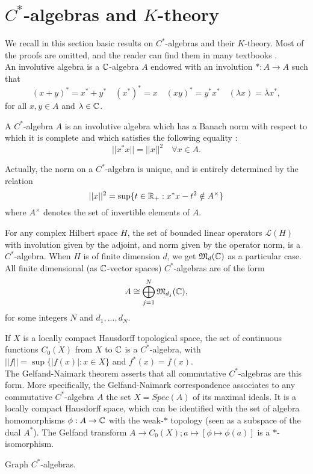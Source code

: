 \section{$C^*$-algebras and $K$-theory}

We recall in this section basic results on $C^*$-algebras and their $K$-theory. Most of the proofs are omitted, and the reader can find them in many textbooks \cite{Murphy}\cite{WeggeOlsen}.\\

An involutive algebra is a $\mathbb C$-algebra $A$ endowed with an involution $* : A\rightarrow A$ such that 
\[ (x+y)^*=x^*+y^* \quad (x^*)^* =x \quad (xy)^* = y^* x^* \quad (\lambda x ) = \overline{\lambda}x^*,\]
for all $x,y\in A$ and $\lambda\in\mathbb C$.
 
\begin{definition}
A $C^*$-algebra $A$ is an involutive algebra which has a Banach norm with respect to which it is complete and which satisfies the following equality :
\[ || x^* x || = || x ||^2\quad \forall x\in A. \]
\end{definition}

Actually, the norm on a $C^*$-algebra is unique, and is entirely determined by the relation
\[ ||x||^2 = \sup \{t\in \mathbb R_+ : x^*x-t^2 \notin A^{\times}\} \]
where $A^\times$ denotes the set of invertible elements of $A$.

\begin{Expl}
For any complex Hilbert space $H$, the set of bounded linear operators $\mathcal L(H)$ with involution given by the adjoint, and norm given by the operator norm, is a $C^*$-algebra. When $H$ is of finite dimension $d$, we get $\mathfrak M_d(\mathbb C)$ as a particular case.\\

All finite dimensional (as $\mathbb C$-vector spaces) $C^*$-algebras are of the form
\[A \cong \bigoplus_{j=1}^N \mathfrak M_{d_j}(\mathbb C),\]
for some integers $N$ and $d_1,...,d_N$.
\end{Expl}

\begin{Expl}
If $X$ is a locally compact Hausdorff topological space, the set of continuous functions $C_0(X)$ from $X$ to $\mathbb C$ is a $C^*$-algebra, with $||f||=\sup\{|f(x)| : x\in X\}$ and $f^*(x)=\overline f(x)$.\\

The Gelfand-Naimark theorem asserts that all commutative $C^*$-algebras are this form. More specifically, the Gelfand-Naimark correspondence associates to any commutative $C^*$-algebra $A$ the set $X=Spec(A)$ of its maximal ideals. It is a locally compact Hausdorff space, which can be identified with the set of algebra homomorphisms $\phi : A\rightarrow \mathbb C$ with the weak-$*$ topology (seen as a subspace of the dual $A^*$). The Gelfand transform $A\rightarrow C_0(X) ; a \mapsto [\phi\mapsto \phi(a)]$ is a $*$-isomorphism.
\end{Expl}

\begin{Expl}
Graph $C^*$-algebras.
\end{Expl}
